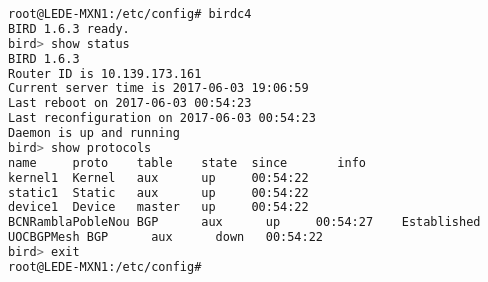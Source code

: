\begin{lstlisting}[language=bash, caption={Birdc Console mode.}]
root@LEDE-MXN1:/etc/config# birdc4
BIRD 1.6.3 ready.
bird> show status
BIRD 1.6.3
Router ID is 10.139.173.161
Current server time is 2017-06-03 19:06:59
Last reboot on 2017-06-03 00:54:23
Last reconfiguration on 2017-06-03 00:54:23
Daemon is up and running
bird> show protocols
name     proto    table    state  since       info
kernel1  Kernel   aux      up     00:54:22
static1  Static   aux      up     00:54:22
device1  Device   master   up     00:54:22
BCNRamblaPobleNou BGP      aux      up     00:54:27    Established
UOCBGPMesh BGP      aux      down   00:54:22
bird> exit
root@LEDE-MXN1:/etc/config#
\end{lstlisting}